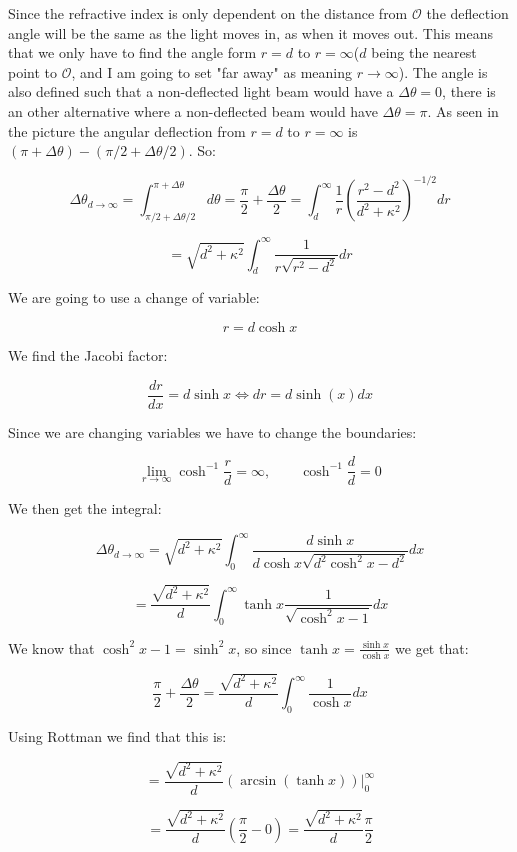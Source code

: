 \documentclass[a4paper,norsk, 10pt]{article}
\begin{document}
Since the refractive index is only dependent on the distance from $\mathcal{O}$ the deflection angle will be the same as the light moves in, as when it moves out. This means that we only have to find the angle form $r = d$ to $r = \infty$($d$ being the nearest point to $\mathcal{O}$, and I am going to set "far away" as meaning $r\rightarrow \infty$). The angle is also defined such that a non-deflected light beam would have a $\Delta \theta = 0$, there is an other alternative where a non-deflected beam would have $\Delta \theta = \pi$. As seen in the picture the angular deflection from $r = d$ to $r = \infty$ is $(\pi + \Delta\theta) - (\pi/2 +\Delta\theta/2)$. So:

$$
\Delta\theta_{d\rightarrow \infty}=\int_{\pi/2 +\Delta\theta/2}^{\pi + \Delta\theta} d\theta = \frac{\pi}{2} + \frac{\Delta \theta}{2} = \int_d^{\infty} \frac{1}{r}\left(\frac{r^2 -d^2}{d^2 +\kappa^2}\right)^{-1/2}dr
$$

$$
= \sqrt{d^2 +\kappa^2}\int_d^{\infty} \frac{1}{r\sqrt{r^2 - d^2}}dr
$$

We are going to use a change of variable:

$$
r = d \cosh x
$$

We find the Jacobi factor:

$$
\frac{dr}{dx} = d\sinh x \Leftrightarrow dr = d\sinh(x) dx
$$

Since we are changing variables we have to change the boundaries:

$$
\lim_{r\rightarrow \infty}\cosh^{-1} \frac{r}{d} = \infty, \qquad \cosh^{-1}\frac{d}{d} = 0
$$

We then get the integral:

$$
\Delta\theta_{d\rightarrow \infty} = \sqrt{d^2 +\kappa^2}\int_0^{\infty} \frac{d\sinh x}{d\cosh x\sqrt{d^2\cosh^2 x - d^2}}dx
$$

$$
= \frac{\sqrt{d^2 +\kappa^2}}{d}\int_0^{\infty} \tanh x \frac{1}{\sqrt{\cosh^2 x - 1}}dx
$$

We know that $\cosh^2 x - 1 = \sinh^2 x$, so since $\tanh x = \frac{\sinh x}{\cosh x}$ we get that:

$$
\frac{\pi}{2} + \frac{\Delta \theta}{2} = \frac{\sqrt{d^2 +\kappa^2}}{d}\int_0^{\infty} \frac{1}{\cosh x}dx
$$

Using Rottman we find that this is:

$$
= \frac{\sqrt{d^2 +\kappa^2}}{d} (\arcsin(\tanh x)) \bigg|_0^{\infty}
$$

$$
= \frac{\sqrt{d^2 +\kappa^2}}{d} \left(\frac{\pi}{2} - 0\right) = \frac{\sqrt{d^2 +\kappa^2}}{d} \frac{\pi}{2}
$$
\end{document}
